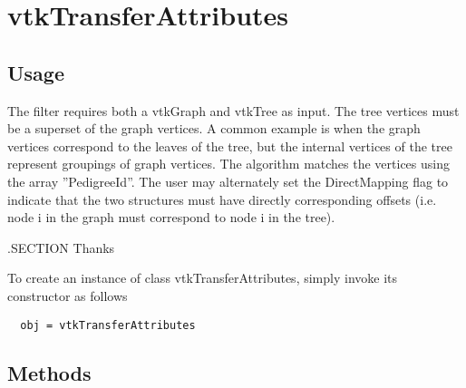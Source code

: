 \section{vtkTransferAttributes}

\subsection{Usage}

 The filter requires
 both a vtkGraph and vtkTree as input.  The tree vertices must be a
 superset of the graph vertices.  A common example is when the graph vertices
 correspond to the leaves of the tree, but the internal vertices of the tree
 represent groupings of graph vertices.  The algorithm matches the vertices
 using the array ''PedigreeId''.  The user may alternately set the
 DirectMapping flag to indicate that the two structures must have directly
 corresponding offsets (i.e. node i in the graph must correspond to node i in
 the tree).

 .SECTION Thanks

To create an instance of class vtkTransferAttributes, simply
invoke its constructor as follows
\begin{verbatim}
  obj = vtkTransferAttributes
\end{verbatim}
\subsection{Methods}

